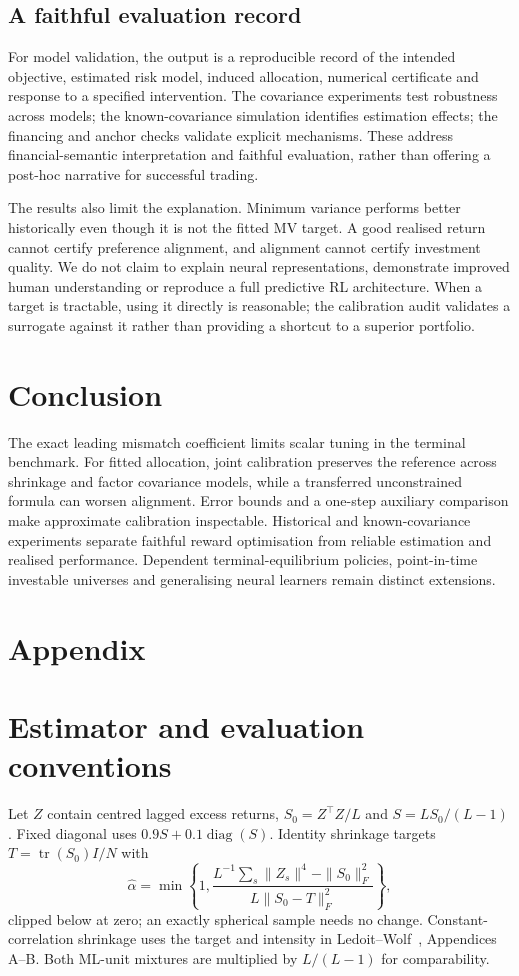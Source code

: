 \documentclass[sigconf,anonymous,review]{acmart}
\begin{document}
\subsection{A faithful evaluation record}
For model validation, the output is a reproducible record of the intended objective, estimated risk model, induced allocation, numerical certificate and response to a specified intervention. The covariance experiments test robustness across models; the known-covariance simulation identifies estimation effects; the financing and anchor checks validate explicit mechanisms. These address financial-semantic interpretation and faithful evaluation, rather than offering a post-hoc narrative for successful trading.

The results also limit the explanation. Minimum variance performs better historically even though it is not the fitted MV target. A good realised return cannot certify preference alignment, and alignment cannot certify investment quality. We do not claim to explain neural representations, demonstrate improved human understanding or reproduce a full predictive RL architecture. When a target is tractable, using it directly is reasonable; the calibration audit validates a surrogate against it rather than providing a shortcut to a superior portfolio.

\section{Conclusion}
The exact leading mismatch coefficient limits scalar tuning in the terminal benchmark. For fitted allocation, joint calibration preserves the reference across shrinkage and factor covariance models, while a transferred unconstrained formula can worsen alignment. Error bounds and a one-step auxiliary comparison make approximate calibration inspectable. Historical and known-covariance experiments separate faithful reward optimisation from reliable estimation and realised performance. Dependent terminal-equilibrium policies, point-in-time investable universes and generalising neural learners remain distinct extensions.



\clearpage
\appendix
\section*{Appendix}
\section{Estimator and evaluation conventions}\label{app:estimators}
Let $Z$ contain centred lagged excess returns, $S_0=Z^\top Z/L$ and $S=L S_0/(L-1)$. Fixed diagonal uses $0.9S+0.1\operatorname{diag}(S)$. Identity shrinkage targets $T=\operatorname{tr}(S_0)I/N$ with
\[
\widehat\alpha=\min\!\left\{1,
\frac{L^{-1}\sum_s\|Z_s\|^4-\|S_0\|_F^2}
{L\|S_0-T\|_F^2}\right\},
\]
clipped below at zero; an exactly spherical sample needs no change. Constant-correlation shrinkage uses the target and intensity in Ledoit--Wolf~\cite{ledoit2004correlation}, Appendices A--B. Both ML-unit mixtures are multiplied by $L/(L-1)$ for comparability.
\end{document}
